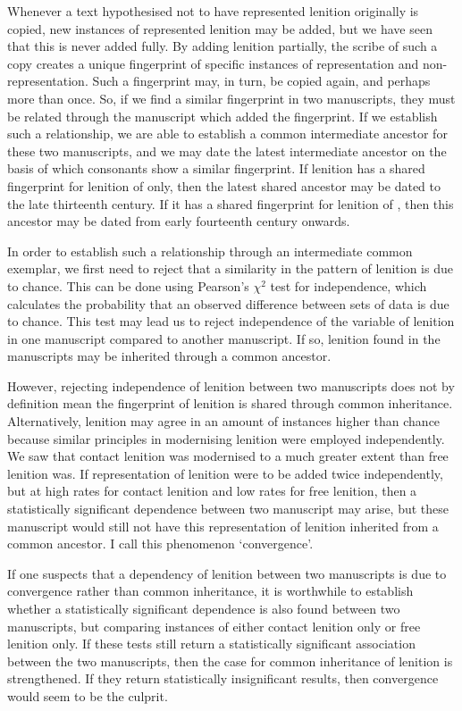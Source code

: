 Whenever a text hypothesised not to have represented lenition originally is copied, new instances of represented lenition may be added, but we have seen that this is never added fully. By adding lenition partially, the scribe of such a copy creates a unique fingerprint of specific instances of representation and non-representation. Such a fingerprint may, in turn, be copied again, and perhaps more than once. So, if we find a similar fingerprint in two manuscripts, they must be related through the manuscript which added the fingerprint. If we establish such a relationship, we are able to establish a common intermediate ancestor for these two manuscripts, and we may date the latest intermediate ancestor on the basis of which consonants show a similar fingerprint. If lenition has a shared fingerprint for lenition of  only, then the latest shared ancestor may be dated to the late thirteenth century. If it has a shared fingerprint for lenition of , then this ancestor may be dated from early fourteenth century onwards.

In order to establish such a relationship through an intermediate common exemplar, we first need to reject that a similarity in the pattern of lenition is due to chance. This can be done using Pearson's \(\chi^2\) test for independence, which calculates the probability that an observed difference between sets of data is due to chance. This test may lead us to reject independence of the variable of lenition in one manuscript compared to another manuscript. If so, lenition found in the manuscripts may be inherited through a common ancestor.

However, rejecting independence of lenition between two manuscripts does not by definition mean the fingerprint of lenition is shared through common inheritance. Alternatively, lenition may agree in an amount of instances higher than chance because similar principles in modernising lenition were employed independently. We saw that contact lenition was modernised to a much greater extent than free lenition was. If representation of lenition were to be added twice independently, but at high rates for contact lenition and low rates for free lenition, then a statistically significant dependence between two manuscript may arise, but these manuscript would still not have this representation of lenition inherited from a common ancestor. I call this phenomenon `convergence'.

If one suspects that a dependency of lenition between two manuscripts is due to convergence rather than common inheritance, it is worthwhile to establish whether a statistically significant dependence is also found between two manuscripts, but comparing instances of either contact lenition only or free lenition only. If these tests still return a statistically significant association between the two manuscripts, then the case for common inheritance of lenition is strengthened. If they return statistically insignificant results, then convergence would seem to be the culprit.

